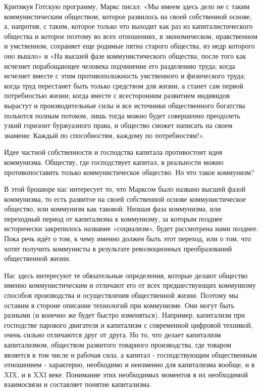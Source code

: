 \documentclass[12pt,a4paper,openany]{book}
\begin{document}
Критикуя Готскую программу, Маркс писал: «Мы имеем здесь дело не с таким коммунистическим обществом, которое развилось на своей собственной основе, а, напротив, с таким, которое только что выходит как раз из капиталистического общества и которое поэтому во всех отношениях, в экономическом, нравственном и умственном, сохраняет еще родимые пятна старого общества, из недр которого оно вышло» и «На высшей фазе коммунистического общества, после того как исчезнет порабощающее человека подчинение его разделению труда; когда исчезнет вместе с этим противоположность умственного и физического труда; когда труд перестанет быть только средством для жизни, а станет сам первой потребностью жизни; когда вместе с всесторонним развитием индивидов вырастут и производительные силы и все источники общественного богатства польются полным потоком, лишь тогда можно будет совершенно преодолеть узкий горизонт буржуазного права, и общество сможет написать на своем знамени: Каждый по способностям, каждому по потребностям!».

Идее частной собственности и господства капитала противостоит идея коммунизма. Обществу, где господствует капитал, в реальности можно противопоставить только коммунистическое общество. Но что такое коммунизм?

В этой брошюре нас интересует то, что Марксом было названо высшей фазой коммунизма, то есть развитое на своей собственной основе коммунистическое общество, или коммунизм как таковой. Низшая фаза коммунизма, или переходный период от капитализма к коммунизму, за которым позднее исторически закрепилось название «социализм», будет рассмотрена нами позднее. Пока речь идёт о том, к чему именно должен быть этот переход, или о том, что хотят получить коммунисты в результате революционных преобразований общественной жизни.

Нас здесь интересуют те обязательные определения, которые делают общество именно коммунистическим и отличают его от всех предшествующих коммунизму способов производства и осуществления общественной жизни. Поэтому мы оставим в стороне описание технологий при коммунизме. Они могут быть разными (и конечно же будет быстро изменяться). Например, капитализм при господстве парового двигателя и капитализм с современной цифровой техникой, очень сильно отличаются друг от друга. Но то, что делает капитализм капитализмом, обществом развитого товарного производства, где товаром является в том числе и рабочая сила, а капитал - господствующим общественным отношением - характерно, необходимо и неизменно для капитализма вообще, и в XIX, и в XXI веке. Понимание этих необходимых моментов в их необходимой взаимосвязи и составляет понятие капитализма.
\end{document}
